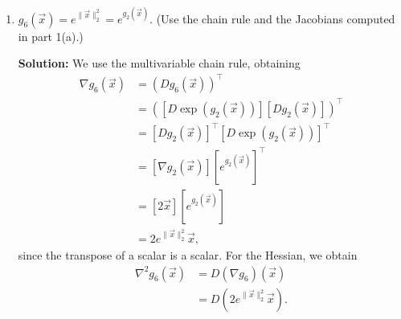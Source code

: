 \documentclass[10pt]{article}
\theoremstyle{definition}
\theoremstyle{plain}
\begin{document}
\begin{enumerate}[label=(\alph*)]
\begin{enumerate}[label=\roman*.]
    To evaluate this product, we look component-by-component and use a multivariate chain rule:
    \begin{align}
    [D(A^\top[\nabla g_4(A\vec{x} - \vec{b})])]_{jk} &= \frac{\partial}{\partial x_k}(A^\top[\nabla g_4(A\vec{x} - \vec{b})])_j \\
    &= \frac{\partial}{\partial x_k}\sum_{i=1}^n a_{ij} [\nabla g_4(A\vec{x} - \vec{b})]_i \\
    &= \sum_{i=1}^n a_{ij} \frac{\partial}{\partial x_k}[\nabla g_4(A\vec{x} - \vec{b})]_i \\
    &= \sum_{i=1}^n a_{ij} \sum_{\ell=1}^n \frac{\partial [\nabla g_4(A\vec{x} - \vec{b})]_i}{\partial (A\vec{x} - \vec{b})_\ell} \frac{\partial (A\vec{x} - \vec{b})_\ell}{\partial x_k} \\
    &= \sum_{i=1}^n a_{ij} \sum_{\ell=1}^n [\nabla^2 g_4(A\vec{x} - \vec{b})]_{i\ell} [A]_{\ell k} \\
    &= \sum_{i=1}^n a_{ij} ([\nabla^2 g_4(A\vec{x} - \vec{b})]A)_{ik} \\
    &= \sum_{i=1}^n [A^\top]_{ji} ([\nabla^2 g_4(A\vec{x} - \vec{b})]A)_{ik} \\
    &= (A^\top [\nabla^2 g_4(A\vec{x} - \vec{b})]A)_{jk}.
    \end{align}

    Thus,
    \begin{equation}
    \nabla^2 g_5(\vec{x}) = A^\top [\nabla^2 g_4(A\vec{x} - \vec{b})]A.
    \end{equation}

    \item $g_6(\vec{x}) = e^{\|\vec{x}\|_2^2} = e^{g_2(\vec{x})}$. (Use the chain rule and the Jacobians computed in part 1(a).)

    \textbf{Solution:} We use the multivariable chain rule, obtaining
    \begin{align}
    \nabla g_6(\vec{x}) &= (Dg_6(\vec{x}))^\top \\
    &= ([D\exp(g_2(\vec{x}))][Dg_2(\vec{x})])^\top \\
    &= [Dg_2(\vec{x})]^\top [D\exp(g_2(\vec{x}))]^\top \\
    &= [\nabla g_2(\vec{x})][e^{g_2(\vec{x})}]^\top \\
    &= [2\vec{x}][e^{g_2(\vec{x})}] \\
    &= 2e^{\|\vec{x}\|_2^2}\vec{x},
    \end{align}
    since the transpose of a scalar is a scalar. For the Hessian, we obtain
    \begin{align}
    \nabla^2 g_6(\vec{x}) &= D(\nabla g_6)(\vec{x}) \\
    &= D(2e^{\|\vec{x}\|_2^2}\vec{x}).
    \end{align}


\end{enumerate}
\end{enumerate}
\end{document}
